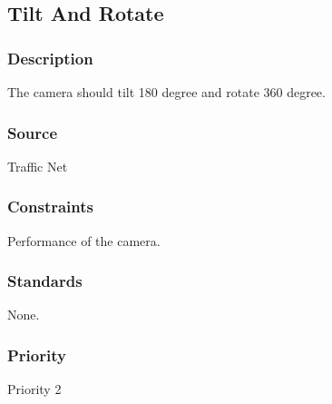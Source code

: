 \subsection{Tilt And Rotate}
\subsubsection{Description}
The camera should tilt 180 degree and rotate 360 degree.
\subsubsection{Source}
Traffic Net
\subsubsection{Constraints}
Performance of the camera.
\subsubsection{Standards}
None.
\subsubsection{Priority}
Priority 2
